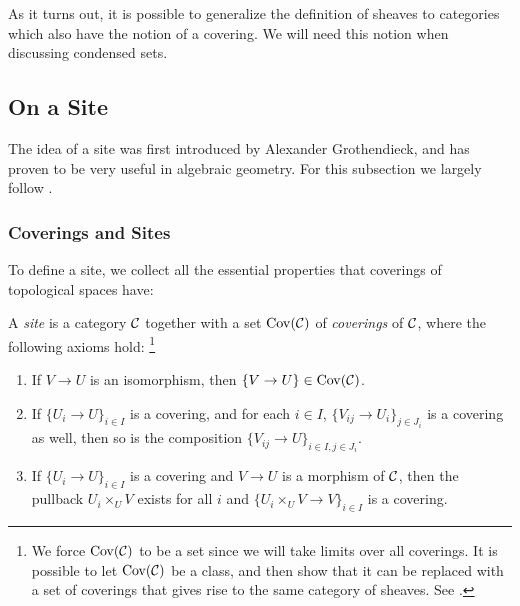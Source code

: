 \documentclass{article}
\DeclareMathOperator{\Cov}{Cov}
\begin{document}
As it turns out, it is possible to generalize
the definition of sheaves to categories which
also have the notion of a covering. We will
need this notion when discussing condensed sets.
\subsection{On a Site}

The idea of a site was first introduced by
Alexander Grothendieck, and has proven to be
very useful in algebraic geometry.
For this subsection we largely follow
\cite[Part 1, Chapter 7]{stacks-project}.

\subsubsection{Coverings and Sites}

To define a site, we collect all the essential
properties that coverings of topological spaces have:
\begin{definition}
    A \emph{site} is a category $\mathcal{C}$ together
    with a set $\Cov(\mcC)$ of \emph{coverings} of
    $\mathcal{C}$, where the following axioms hold:
    \footnote{We force $\Cov(\mcC)$ to be a set since we will take limits
        over all coverings. It is possible to let $\Cov(\mcC)$ be a class,
        and then show that it can be replaced with a set of coverings
        that gives rise to the same category of sheaves.
        See \cite[Remark 7.6.3]{stacks-project}.}
    \begin{enumerate}
        \item If $V \to U$ is an isomorphism, then $\{V \to U\}\in \Cov(\mcC)$.
        \item If $\{U_i \to U\}_{i\in I}$ is a covering, and for each $i\in I$,
              $\{V_{ij} \to U_i\}_{j \in J_i}$ is a covering as well, then so is the
              composition $\{V_{ij} \to U\}_{i\in I, j\in J_i}$.
        \item If $\{U_i \to U\}_{i\in I}$ is a covering and $V \to U$ is a morphism
              of $\mathcal{C}$, then the pullback $U_i\times_U V$ exists for all $i$
              and $\{U_i\times_U V \to V\}_{i\in I}$ is a covering.
    \end{enumerate}
\end{definition}
\end{document}

